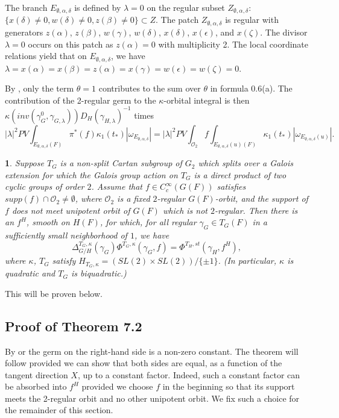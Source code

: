 \documentclass[12pt,letterpaper]{amsart}
\newcommand{\eps}{\epsilon}
\newcommand{\proclaimname}{}
\newtheorem*{proclaimx}{\proclaimname}
\newenvironment{proclaim}[1]%
  {\renewcommand{\proclaimname}{#1}\begin{proclaimx}}{\end{proclaimx}}
\begin{document}
The branch $E_{\emptyset,\alpha,\delta}$ is defined by
$\lambda =0$ on the regular subset $Z_{\emptyset,\alpha,\delta}$:
$\{x(\delta)\not= 0,w(\delta)\not= 0,z(\beta)\not= 0\}\subset Z$.
The patch $Z_{\emptyset,\alpha,\delta}$ is regular with generators
$z(\alpha)$, $z(\beta)$, $w(\gamma)$, $w(\delta)$, $x(\delta)$,
$x(\epsilon)$, and $x(\zeta)$. The divisor $\lambda =0$ occurs
on this patch as $z(\alpha)=0$ with multiplicity 2.
The local coordinate relations yield that on $E_{\emptyset,\alpha,\delta}$,
we have $\lambda=x(\alpha)=x(\beta)=z(\alpha)=x(\gamma)=w(\eps)=w(\zeta)=0$.

By \cite[ch 6, \S 2]{Ha92a}, only the term $\theta=1$
contributes to the sum over $\theta$ in formula 0.6(a).
The contribution of the 2-regular germ to the $\kappa$-orbital
integral is then
$\kappa(inv(\gamma_G^0,\gamma_{G,\lambda}))
D_H(\gamma_{H,\lambda})^{-1}$ times
\[
|\lambda|^2
PV\int_{E_{\emptyset,\alpha,\delta}(F)}\pi^*(f)
\kappa_1(t_*)
|\omega_{E_{\emptyset,\alpha,\delta}}|
=|\lambda|^2
PV\int_{{\mathcal O}_2}f\int_{E_{\emptyset,\alpha,\delta}(u)(F)}
\kappa_1(t_*)
|\omega_{E_{\emptyset,\alpha,\delta}(u)}|
.
\tag{7.1}
\]

\begin{proclaim}{Theorem 7.2} Suppose $T_G$ is a non-split Cartan subgroup
of $G_2$ which splits over a
Galois extension for which the Galois group action on $T_G$
is a direct product of two cyclic groups of order $2$.
Assume that $f\in C_c^\infty(G(F))$ satisfies $supp(f)\cap {\mathcal O}_2
\not= \emptyset$, where ${\mathcal O}_2$ is a fixed $2$-regular
$G(F)$-orbit,
and the support of $f$ does not meet unipotent orbit
of $G(F)$ which is not $2$-regular. Then there is an $f^H$, smooth on
$H(F)$, for which, for all regular $\gamma_G\in T_G(F)$
in a sufficiently small neighborhood of $1$, we have
\[
\Delta_{G/H}^{T_G,\kappa}(\gamma_G)
\Phi^{T_G,\kappa}(\gamma_G,f)=
\Phi^{T_H,st}(\gamma_H,f^H),
\]
where $\kappa$, $T_G$ satisfy
$H_{T_G,\kappa}=(SL(2)\times SL(2))/\{\pm 1\}$.
(In particular, $\kappa$ is quadratic and $T_G$ is biquadratic.)
\end{proclaim}

This will be proven below.

\subsection*{Proof of Theorem 7.2}

By \cite{Sh72} or \cite{Ro80} the germ on the
right-hand side is a non-zero constant. The theorem will follow provided
we can show that both sides are equal, as a function of the tangent
direction $X$, up to a constant factor. Indeed, such a constant
factor can be absorbed into
$f^H$ provided we choose $f$ in the beginning so that its support meets the
2-regular orbit and no other unipotent orbit. We fix such a choice
for the remainder of this section.
\end{document}
